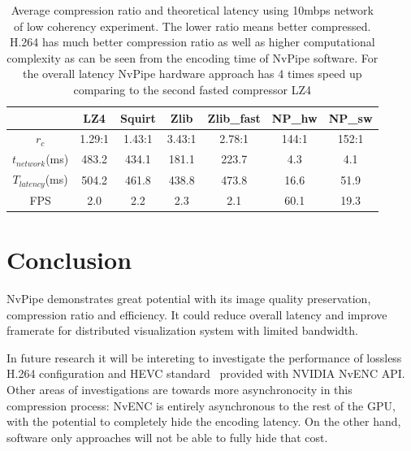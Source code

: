 \documentclass[review]{vgtc}                 %
\begin{document}
\begin{table}[htb]
  \caption{Average compression ratio and theoretical latency using 10mbps network of low coherency experiment. The lower ratio means better compressed. H.264 has much better compression ratio as well as higher computational complexity as can be seen from the encoding time of NvPipe software. For the overall latency NvPipe hardware approach has 4 times speed up comparing to the second fasted compressor LZ4}
  \label{tab:latency}
  \scriptsize
  \begin{center}
    \begin{tabular}{ccccccc}
      & LZ4 & Squirt & Zlib & Zlib\_fast & NP\_hw & NP\_sw \\
    \hline
      \(r_c\) & 1.29:1 & 1.43:1 & 3.43:1 & 2.78:1 & 144:1 & 152:1 \\
      \(t_{network}\)(ms) & 483.2 & 434.1 & 181.1 & 223.7 & 4.3 & 4.1 \\
      \(T_{latency}\)(ms) & 504.2 & 461.8 & 438.8 & 473.8 & 16.6 & 51.9 \\
      FPS & 2.0 & 2.2 & 2.3 & 2.1 & 60.1 & 19.3 
    \end{tabular}
  \end{center}
\end{table}


\section{Conclusion}


NvPipe demonstrates great potential with its image quality preservation, compression ratio and efficiency. It could reduce overall latency and improve framerate for distributed visualization system with limited bandwidth. 

In future research it will be intereting to investigate the performance of lossless H.264 configuration and HEVC standard~\cite{sullivan2012overview} provided with NVIDIA NvENC API. Other areas of investigations are towards more asynchronocity in this compression process: NvENC is entirely asynchronous to the rest of the GPU, with the potential to completely hide the encoding latency. On the other hand, software only approaches will not be able to fully hide that cost.





\end{document}
